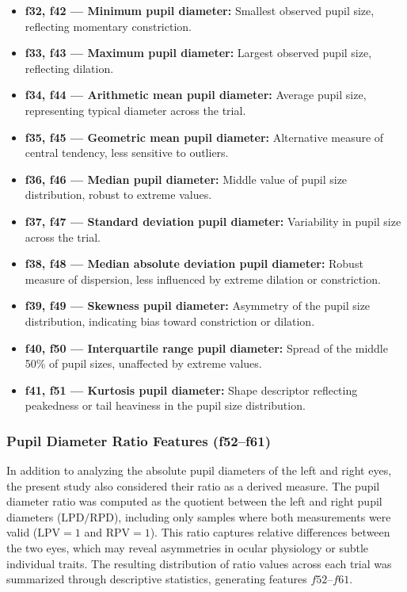 \documentclass{article}
\begin{document}
\begin{itemize}
    \item \textbf{f32, f42 — Minimum pupil diameter:} Smallest observed pupil size, reflecting momentary constriction.
    \item \textbf{f33, f43 — Maximum pupil diameter:} Largest observed pupil size, reflecting dilation.
    \item \textbf{f34, f44 — Arithmetic mean pupil diameter:} Average pupil size, representing typical diameter across the trial.
    \item \textbf{f35, f45 — Geometric mean pupil diameter:} Alternative measure of central tendency, less sensitive to outliers.
    \item \textbf{f36, f46 — Median pupil diameter:} Middle value of pupil size distribution, robust to extreme values.
    \item \textbf{f37, f47 — Standard deviation pupil diameter:} Variability in pupil size across the trial.
    \item \textbf{f38, f48 — Median absolute deviation pupil diameter:} Robust measure of dispersion, less influenced by extreme dilation or constriction.
    \item \textbf{f39, f49 — Skewness pupil diameter:} Asymmetry of the pupil size distribution, indicating bias toward constriction or dilation.
    \item \textbf{f40, f50 — Interquartile range pupil diameter:} Spread of the middle 50\% of pupil sizes, unaffected by extreme values.
    \item \textbf{f41, f51 — Kurtosis pupil diameter:} Shape descriptor reflecting peakedness or tail heaviness in the pupil size distribution.
\end{itemize}

\subsubsection{Pupil Diameter Ratio Features (f52–f61)}

In addition to analyzing the absolute pupil diameters of the left and right eyes, the present study also considered their ratio as a derived measure. 
The pupil diameter ratio was computed as the quotient between the left and right pupil diameters (\(\mathrm{LPD}/\mathrm{RPD}\)), including only samples where both measurements were valid (\(\mathrm{LPV} = 1\) and \(\mathrm{RPV} = 1\)). 
This ratio captures relative differences between the two eyes, which may reveal asymmetries in ocular physiology or subtle individual traits. 
The resulting distribution of ratio values across each trial was summarized through descriptive statistics, generating features \(f52\)--\(f61\).
\end{document}
